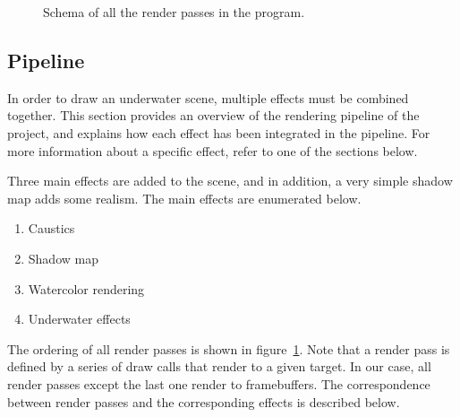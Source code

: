 \documentclass{article}
\begin{document}
\begin{figure}[h]
    \centering
	\caption{Schema of all the render passes in the program.}
	\label{fig:render_passes}
\end{figure}

\subsection{Pipeline}

In order to draw an underwater scene, multiple effects must be combined together. 
This section provides an overview of the rendering pipeline of the project, 
and explains how each effect has been integrated in the pipeline. 
For more information about a specific effect, refer to one of the sections below.

\medskip \par
\noindent
Three main effects are added to the scene, and in addition, a very simple shadow map adds some realism. 
The main effects are enumerated below.
\begin{enumerate}
	\item Caustics
	\item Shadow map
	\item Watercolor rendering
	\item Underwater effects
\end{enumerate}

\noindent
The ordering of all render passes is shown in figure~\ref{fig:render_passes}. 
Note that a render pass is defined by a series of draw calls that render to a given target. 
In our case, all render passes except the last one render to framebuffers. 
The correspondence between render passes and the corresponding effects is described below.
\end{document}
